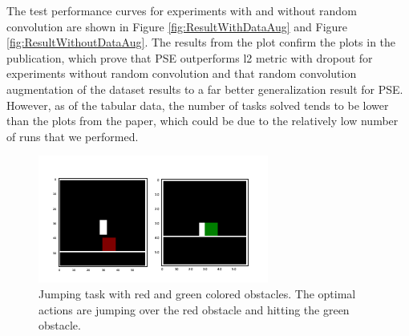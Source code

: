\documentclass{usiinftr}
\begin{document}
The test performance curves for experiments with and without random convolution are shown in Figure \ref{fig:ResultWithDataAug} and Figure \ref{fig:ResultWithoutDataAug}. The results from the plot confirm the plots in the publication, which prove that PSE outperforms l2 metric with dropout for experiments without random convolution and that random convolution augmentation of the dataset results to a far better generalization result for PSE. However, as of the tabular data, the number of tasks solved tends to be lower than the plots from the paper, which could be due to the relatively low number of runs that we performed. 

\begin{figure}[h]
    \centering
    \includegraphics[width = 0.6\linewidth]{figures/jumping_colors.png}
    \caption{Jumping task with red and green colored obstacles. The optimal actions are jumping over the red obstacle and hitting the green obstacle.}
    \label{fig:JumpingColors}
\end{figure}
\end{document}
